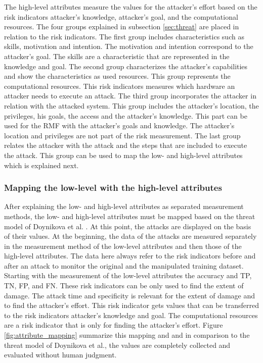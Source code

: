 The high-level attributes measure the values for the attacker's effort based on the risk indicators attacker's knowledge, attacker's goal, and the computational resources. The four groups explained in subsection \ref{sec:threat} are placed in relation to the risk indicators. The first group includes characteristics such as skills, motivation and intention. The motivation and intention correspond to the attacker's goal. The skills are a characteristic that are represented in the knowledge and goal. The second group characterizes the attacker's capabilities \cite{DBLP:journals/iet-cdt/XueGLYO20} and show the characteristics as used resources. This group represents the computational resources. This risk indicators measures which hardware an attacker needs to execute an attack. The third group incorporates the attacker in relation with the attacked system. This group includes the attacker's location, the privileges, his goals, the access and the attacker's knowledge. This part can be used for the RMF with the attacker's goals and knowledge. The attacker's location and privileges are not part of the risk measurement. The last group relates the attacker with the attack and the steps that are included to execute the attack. This group can be used to map the low- and high-level attributes which is explained next.

\subsubsection*{Mapping the low-level with the high-level attributes}
\label{sec:map_low_high}

After explaining the low- and high-level attributes as separated measurement methods, the low- and high-level attributes must be mapped based on the threat model of Doynikova et al. \cite{DBLP:conf/crisis/DoynikovaNGK20}. At this point, the attacks are displayed on the basis of their values. At the beginning, the data of the attacks are measured separately in the measurement method of the low-level attributes and then those of the high-level attributes. The data here always refer to the risk indicators before and after an attack to monitor the original and the manipulated training dataset. Starting with the measurement of the low-level attributes the accuracy and TP, TN, FP, and FN. These risk indicators can be only used to find the extent of damage. The attack time and specificity is relevant for the extent of damage and to find the attacker's effort. This risk indicator gets values that can be transferred to the risk indicators attacker's knowledge and goal. The computational resources are a risk indicator that is only for finding the attacker's effort. Figure \ref{fig:attribute_mapping} summarize this mapping and and in comparison to the threat model of Doynikova et al., the values are completely collected and evaluated without human judgment.

